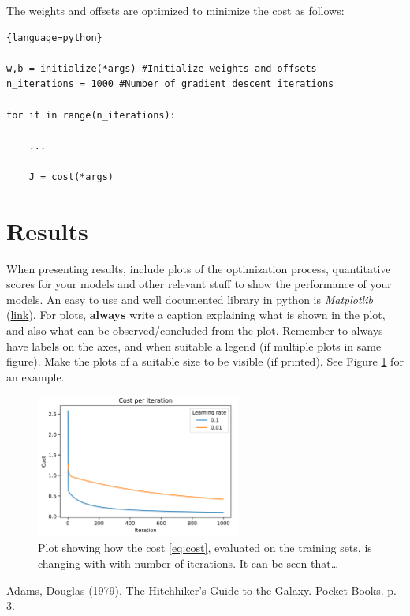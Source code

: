 \documentclass[a4paper,10pt]{article}
\begin{document}
\newpage
\hfill \break
The weights and offsets are optimized to minimize the cost as follows:

\begin{lstlisting}[frame=lines,framesep=2mm]{language=python}

w,b = initialize(*args) #Initialize weights and offsets
n_iterations = 1000 #Number of gradient descent iterations

for it in range(n_iterations):
    
    ...
    
    J = cost(*args)
\end{lstlisting}


\section{Results}
When presenting results, include plots of the optimization process, quantitative scores for your models and other relevant stuff to show the performance of your models. An easy to use and well documented library in python is \emph{Matplotlib} (\href{https://matplotlib.org/}{link}). 
For plots, \textbf{always} write a caption explaining what is shown in the plot, and also what can be observed/concluded from the plot. Remember to always have labels on the axes, and when suitable a legend (if multiple plots in same figure). Make the plots of a suitable size to be visible (if printed). See Figure \ref{fig:cost_per_iteration} for an example.


\begin{figure}[H]
 \centering
    \includegraphics[width=0.6\textwidth]{figures/cost_per_iteration_lr.png}
    \caption{Plot showing how the cost \eqref{eq:cost}, evaluated on the training sets, is changing with with number of iterations. It can be seen that\ldots}
    \label{fig:cost_per_iteration}
\end{figure}



\begin{thebibliography}{1}

 Adams, Douglas (1979). The Hitchhiker's Guide to the Galaxy. Pocket Books. p. 3.

\end{thebibliography}
\end{document}
